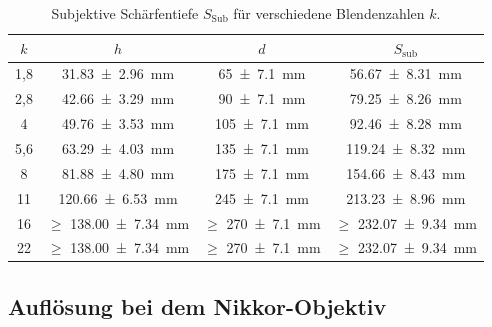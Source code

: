 		\begin{table}[ht]
			\centering
			\begin{tabular}{c|c|c|c}
				$k$ & $h$ & $d$ & $S_\text{sub}$\\
				\hline
				1,8 & \SI{31,83+-2,96}{\milli\meter} & \SI{65+-7,1}{\milli\meter} & \SI{56,67+-8,31}{\milli\meter}\\
				2,8 & \SI{42,66+-3,29}{\milli\meter} & \SI{90+-7,1}{\milli\meter} & \SI{79,25+-8,26}{\milli\meter}\\
				4 & \SI{49,76+-3,53}{\milli\meter} & \SI{105+-7,1}{\milli\meter} & \SI{92,46+-8,28}{\milli\meter}\\
				5,6 & \SI{63,29+-4,03}{\milli\meter} & \SI{135+-7,1}{\milli\meter} & \SI{119,24+-8,32}{\milli\meter}\\
				8 & \SI{81,88+-4,80}{\milli\meter} & \SI{175+-7,1}{\milli\meter} & \SI{154,66+-8,43}{\milli\meter} \\
				11 & \SI{120,66+-6,53}{\milli\meter} & \SI{245+-7,1}{\milli\meter} & \SI{213,23+-8,96}{\milli\meter}\\
				16 & $\geq$ \SI{138,00+-7,34}{\milli\meter} & $\geq$ \SI{270+-7,1}{\milli\meter} & $\geq$ \SI{232,07+-9,34}{\milli\meter}\\
				22 & $\geq$ \SI{138,00+-7,34}{\milli\meter} & $\geq$ \SI{270+-7,1}{\milli\meter} & $\geq$ \SI{232,07+-9,34}{\milli\meter}\\
			\end{tabular}
			\caption{Subjektive Schärfentiefe $S_\text{Sub}$ für verschiedene Blendenzahlen $k$.} %
			\label{tab:Schärfentiefe_subj}
		\end{table}		
		
	\subsection{Auflösung bei dem Nikkor-Objektiv}
		
